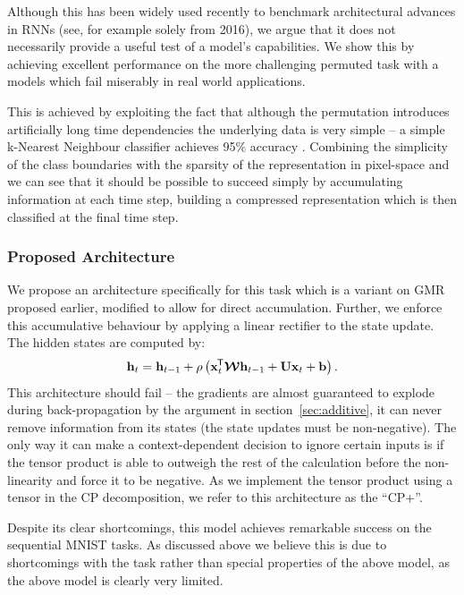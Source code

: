 Although this has been widely used recently to benchmark architectural
advances in RNNs (see, for example 
\autocite{Zhang2016, Barone2016, Gao2016, Neyshabur2016, Cooijmans2016}
solely from 2016), we argue that it does not necessarily provide a useful test of
a model's capabilities. We show this by achieving excellent performance
on the more challenging permuted task with a models which fail miserably
in real world applications. 

This is achieved by exploiting the fact
that although the permutation introduces artificially long time dependencies
the underlying data is very simple -- a simple k-Nearest Neighbour classifier
achieves 95\% accuracy \autocite{Lecun1998}. Combining the simplicity of the
class boundaries with the sparsity of the representation in pixel-space and we
can see that it should be possible to succeed simply by accumulating information
at each time step, building a compressed representation which is then classified
at the final time step.

\subsubsection{Proposed Architecture}
We propose an architecture specifically for this task which is a variant on
GMR proposed earlier, modified to allow for direct accumulation.
Further, we enforce this accumulative behaviour by applying a linear rectifier
to the state update. The hidden states are computed by:
\begin{equation}\label{eq:cpplus}
	\mathbf{h}_t = \mathbf{h}_{t-1} + \rho\left( \mathbf{x}^{\mkern-1.5mu\mathsf{T}}_t\bm{\mathcal{W}}\mathbf{h}_{t-1} + \mathbf{U}\mathbf{x}_t + \mathbf{b}\right).
\end{equation} This architecture should fail -- the gradients are almost
guaranteed to explode during back-propagation by the argument in section~\ref{sec:additive},
it can never remove information from its states (the state updates must be non-negative).
The only way it can make a context-dependent decision to ignore certain inputs is
if the tensor product is able to outweigh the rest of the calculation before the
non-linearity and force it to be negative. As we implement the tensor product
using a tensor in the CP decomposition, we refer to this architecture as the
``CP+''.

Despite its clear shortcomings, this model achieves remarkable success on the
sequential MNIST tasks. As discussed above we believe this is due to shortcomings
with the task rather than special properties of the above model, as the above
model is clearly very limited.

